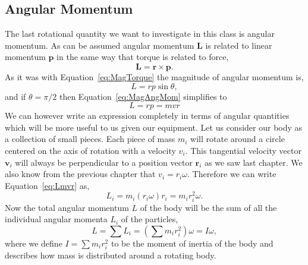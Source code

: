 \documentclass[main.tex]{subfiles}
\begin{document}
\subsection*{Angular Momentum}
The last rotational quantity we want to investigate in this class is angular momentum. As can be assumed angular momentum $\mathbf{L}$ is related to linear momentum $\mathbf{p}$ in the same way that torque is related to force,
\begin{equation} \label{eq:VectAngMom}
\mathbf{L}=\mathbf{r} \times \mathbf{p}.
\end{equation}
As it was with Equation~\eqref{eq:MagTorque} the magnitude of angular momentum is,
\begin{equation}\label{eq:MagAngMom}
L=rp\sin\theta,
\end{equation}
and if $\theta=\pi/2$ then Equation~\eqref{eq:MagAngMom} simplifies to 
\begin{equation} \label{eq:Lmvr}
L=rp=mvr
\end{equation}
We can however write an expression completely in terms of angular quantities which will be more useful to us given our equipment. Let us consider our body as a collection of small pieces. Each piece of mass $m_i$ will rotate around a circle centered on the axis of rotation with a velocity $v_i.$ This tangential velocity vector $\mathbf{v}_i$ will always be perpendicular to a position vector $\mathbf{r}_i$ as we saw last chapter. We also know from the previous chapter that $v_i=r_i\omega.$ Therefore we can write Equation~\eqref{eq:Lmvr} as,
\begin{equation}
L_i=m_i(r_i\omega)r_i=m_ir_i^2\omega.
\end{equation}
Now the total angular momentum $L$ of the body will be the sum of all the individual angular momenta $L_i$ of the particles,
\begin{equation}
L=\sum L_i=\left(\sum m_ir_i^2\right)\omega=I\omega,
\end{equation}
where we define $I=\sum m_ir_i^2$ to be the moment of inertia of the body and describes how mass is distributed around a rotating body. 
\end{document}
